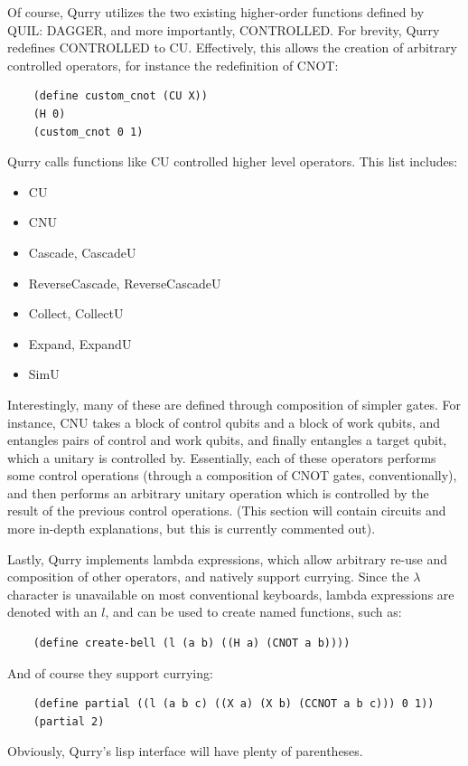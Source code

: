 \documentclass[a4paper,twocolumn,11pt,accepted=2017-05-09]{quantumarticle}
\begin{document}
    Of course, Qurry utilizes the two existing higher-order functions defined by QUIL: DAGGER, and more importantly, CONTROLLED.
    For brevity, Qurry redefines CONTROLLED to CU.
    Effectively, this allows the creation of arbitrary controlled operators, for instance the redefinition of CNOT:
    \begin{lstlisting}
    (define custom_cnot (CU X))
    (H 0)
    (custom_cnot 0 1)
    \end{lstlisting}
    Qurry calls functions like CU controlled higher level operators.
    This list includes:
    \begin{itemize}
        \item CU 
        \item CNU
        \item Cascade, CascadeU
        \item ReverseCascade, ReverseCascadeU
        \item Collect, CollectU
        \item Expand, ExpandU
        \item SimU
    \end{itemize}
    Interestingly, many of these are defined through composition of simpler gates.
    For instance, CNU takes a block of control qubits and a block of work qubits, and entangles pairs of control and work qubits, and finally entangles a target qubit, which a unitary is controlled by.
    Essentially, each of these operators performs some control operations (through a composition of CNOT gates, conventionally), and then performs an arbitrary unitary operation which is controlled by the result of the previous control operations.
    (This section will contain circuits and more in-depth explanations, but this is currently commented out).

    Lastly, Qurry implements lambda expressions, which allow arbitrary re-use and composition of other operators, and natively support currying.
    Since the $\lambda$ character is unavailable on most conventional keyboards, lambda expressions are denoted with an $l$, and can be used to create named functions, such as:
    \begin{lstlisting}
    (define create-bell (l (a b) ((H a) (CNOT a b))))
    \end{lstlisting}
    And of course they support currying:
    \begin{lstlisting}
    (define partial ((l (a b c) ((X a) (X b) (CCNOT a b c))) 0 1))
    (partial 2)
    \end{lstlisting}
    Obviously, Qurry's lisp interface will have plenty of parentheses.
\end{document}
